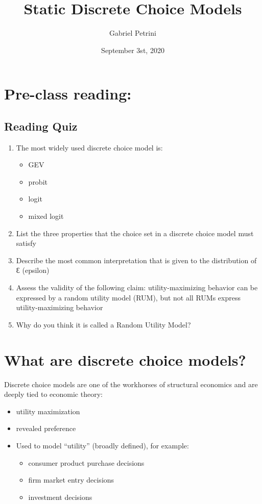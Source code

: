 \documentclass[11pt]{article}
\author{Gabriel Petrini}
\date{September 3st, 2020}
\title{Static Discrete Choice Models}
\begin{document}
\maketitle
\tableofcontents


\section{Pre-class reading: \textcite[Ch 1, 3.1--3.3, 37--3.8]{train2009}}
\label{sec:org236218c}

\subsection{Reading Quiz}
\label{sec:org423e952}

\begin{enumerate}
\item The most widely used discrete choice model is:
\begin{itemize}
\item GEV
\item probit
\item logit
\item mixed logit
\end{itemize}

\item List the three properties that the choice set in a discrete choice model must satisfy

\item Describe the most common interpretation that is given to the distribution of Ɛ (epsilon)

\item Assess the validity of the following claim: utility-maximizing behavior can be expressed by a random utility model (RUM), but not all RUMs express utility-maximizing behavior

\item Why do you think it is called a Random Utility Model?
\end{enumerate}


\section{What are discrete choice models?}
\label{sec:org41a7d6c}


Discrete choice models are one of the workhorses of structural economics and are deeply tied to economic theory:
\begin{itemize}
\item utility maximization
\item revealed preference
\item Used to model ``utility'' (broadly defined), for example:
\begin{itemize}
\item consumer product purchase decisions
\item firm market entry decisions
\item investment decisions
\end{itemize}
\end{itemize}
\end{document}
